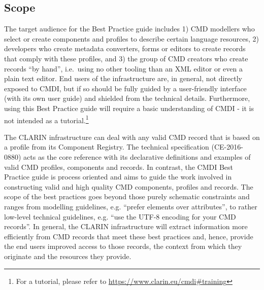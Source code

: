\documentclass[]{article}
\date{}
\begin{document}
\subsection{Scope}\label{scope}

The target audience for the Best Practice guide includes 1) CMD
modellers who select or create components and profiles to describe
certain language resources, 2) developers who create metadata
converters, forms or editors to create records that comply with these
profiles, and 3) the group of CMD creators who create records ``by
hand'', i.e.~using no other tooling than an XML editor or even a plain
text editor. End users of the infrastructure are, in general, not
directly exposed to CMDI, but if so should be fully guided by a
user-friendly interface (with its own user guide) and shielded from the
technical details. Furthermore, using this Best Practice guide will
require a basic understanding of CMDI - it is not intended as a
tutorial.\footnote{For a tutorial, please refer to
  \url{https://www.clarin.eu/cmdi\#training}}

The CLARIN infrastructure can deal with any valid CMD record that is
based on a profile from its Component Registry. The technical
specification (CE-2016-0880) acts as the core reference with its
declarative definitions and examples of valid CMD profiles, components
and records. In contrast, the CMDI Best Practice guide is process
oriented and aims to guide the work involved in constructing valid and
high quality CMD components, profiles and records. The scope of the best
practices goes beyond those purely schematic constraints and ranges from
modelling guidelines, e.g. ``prefer elements over attributes'', to
rather low-level technical guidelines, e.g. ``use the UTF-8 encoding for
your CMD records''. In general, the CLARIN infrastructure will extract
information more efficiently from CMD records that meet these best
practices and, hence, provide the end users improved access to those
records, the context from which they originate and the resources they
provide.
\end{document}
